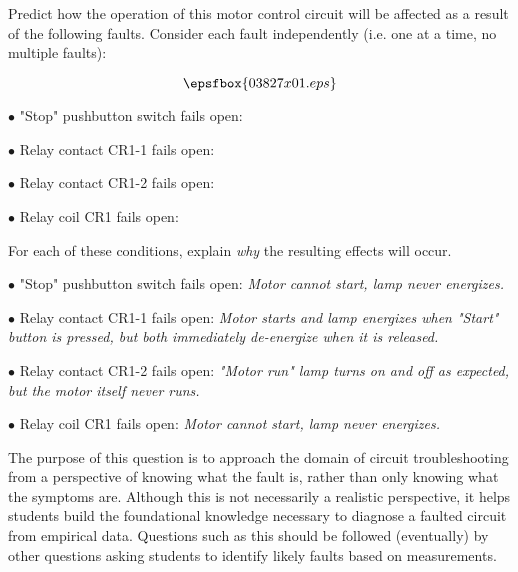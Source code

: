 

Predict how the operation of this motor control circuit will be affected as a result of the following faults.  Consider each fault independently (i.e. one at a time, no multiple faults):

$$\epsfbox{03827x01.eps}$$

\medskip
\item{$\bullet$} "Stop" pushbutton switch fails open:
\vskip 5pt
\item{$\bullet$} Relay contact CR1-1 fails open:
\vskip 5pt
\item{$\bullet$} Relay contact CR1-2 fails open:
\vskip 5pt
\item{$\bullet$} Relay coil CR1 fails open:
\medskip

For each of these conditions, explain {\it why} the resulting effects will occur.







\medskip
\item{$\bullet$} "Stop" pushbutton switch fails open: {\it Motor cannot start, lamp never energizes.}
\vskip 5pt
\item{$\bullet$} Relay contact CR1-1 fails open: {\it Motor starts and lamp energizes when "Start" button is pressed, but both immediately de-energize when it is released.}
\vskip 5pt
\item{$\bullet$} Relay contact CR1-2 fails open: {\it "Motor run" lamp turns on and off as expected, but the motor itself never runs.}
\vskip 5pt
\item{$\bullet$} Relay coil CR1 fails open: {\it Motor cannot start, lamp never energizes.}
\medskip







The purpose of this question is to approach the domain of circuit troubleshooting from a perspective of knowing what the fault is, rather than only knowing what the symptoms are.  Although this is not necessarily a realistic perspective, it helps students build the foundational knowledge necessary to diagnose a faulted circuit from empirical data.  Questions such as this should be followed (eventually) by other questions asking students to identify likely faults based on measurements.




